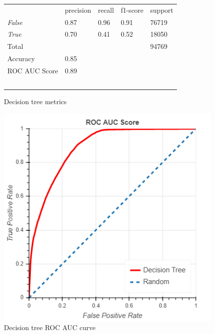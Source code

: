 \documentclass[10pt, conference, compsocconf]{IEEEtran}
\begin{document}

\begin{figure}
  \begin{tabular}{lllll}
                  & precision & recall      & f1-score  & support \\
  \textit{False}  & 0.87      & 0.96        & 0.91      & 76719 \\
  \textit{True}   & 0.70      & 0.41        & 0.52      & 18050 \\
  Total			      &           &             &           & 94769 \\
  Accuracy        & 0.85 \\
  ROC AUC Score	  & 0.89 \\\
  \end{tabular}
  \caption{Decision tree metrics}
  \label{fig:decision_tree_metrics}
\end{figure}

\begin{figure}
  \includegraphics[scale=0.45]{decision_tree_roc}
  \centering
  \caption{Decision tree ROC AUC curve}
  \label{fig:decision_tree_roc}
\end{figure}
\end{document}
